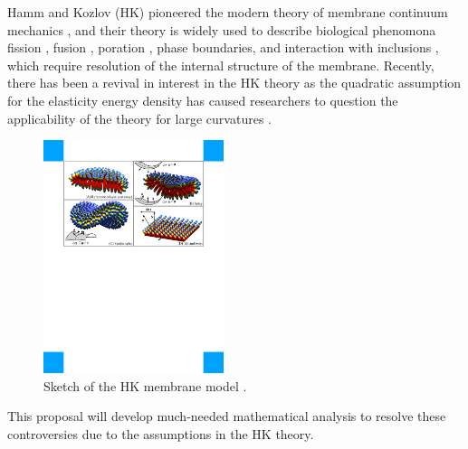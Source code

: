 Hamm and Kozlov (HK) pioneered 
the modern theory of membrane continuum mechanics \cite{Hamm2000}, and their theory
is widely used to describe biological phenomona 
fission \cite{FrEsAkSh15, Maetal15, PhysRevE.79.031926},
fusion \cite{ChKo08, KoKo2002,Kuzmin7235,Aeffner2012},
poration \cite{Gaetal20}, phase boundaries, and interaction with inclusions
\cite{SeLeMaEg17,Saetal20, Pietal20}, which require resolution of the internal structure of the membrane.  
Recently, there has been a revival in interest in the HK theory as the quadratic assumption
for the elasticity energy density has caused
researchers to question the applicability of the theory 
for large curvatures
\cite{PhysRevLett.117.188102, ARGUDO20161619}.
%
\begin{figure}
\centerline{\includegraphics[width=0.47\textwidth]{Figures/Deformations.pdf}}
  \vspace{-5pt}
\caption{\label{fig:deformations} \footnotesize Sketch of the HK
 membrane model \cite{Hamm2000}.}
\end{figure}
%
This proposal will develop much-needed mathematical analysis to resolve
these controversies due to the assumptions in the HK theory. 



